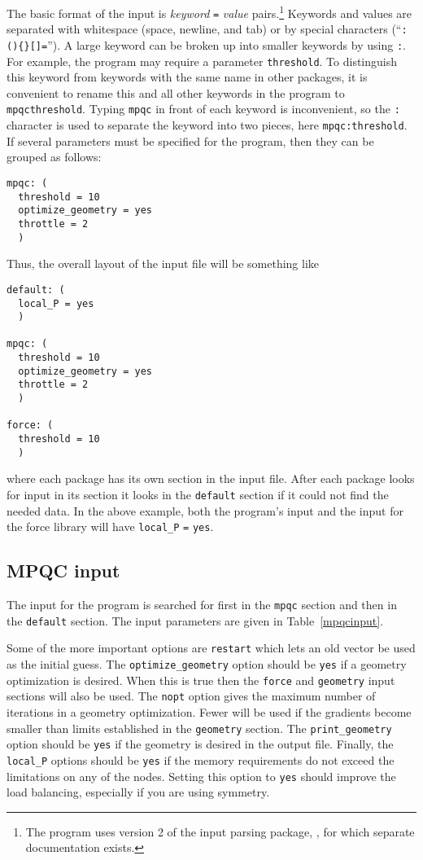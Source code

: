 The basic format of the input is {\it keyword} {\tt =} {\it value}
pairs.\footnote
  {
  The \mpqc{} program uses version 2 of the input parsing package, \libip{},
  for which separate documentation exists.
  }
Keywords and values are separated with whitespace (space, newline,
and tab) or by special characters (``{\tt :()\{\}[]=}'').  A large keyword
can be broken up into smaller keywords by using {\tt :}.  For example,
the \mpqc{} program may require a parameter {\tt threshold}.  To
distinguish this keyword from keywords with the same name in other
packages, it is convenient to rename this and all other keywords in
the \mpqc{} program to {\tt mpqcthreshold}.  Typing {\tt mpqc} in
front of each keyword is inconvenient, so the {\tt :} character
is used to separate the keyword into two pieces, here {\tt mpqc:threshold}.
If several parameters must be specified for the \mpqc{} program, then
they can be grouped as follows:
\begin{verbatim}
mpqc: (
  threshold = 10
  optimize_geometry = yes
  throttle = 2
  )
\end{verbatim}

Thus, the overall layout of the input file will be something like
\begin{verbatim}
default: (
  local_P = yes
  )

mpqc: (
  threshold = 10
  optimize_geometry = yes
  throttle = 2
  )

force: (
  threshold = 10
  )
\end{verbatim}
where each package has its own section in the input file.  After each
package looks for input in its section it looks in the {\tt default}
section if it could not find the needed data.  In the above example,
both the \mpqc{} program's input and the input for the force library
will have {\tt local\_P} {\tt =} {\tt yes}.

\subsection{MPQC input}
\label{mpqcsection}
The input for the \mpqc{} program is searched for first in the {\tt mpqc}
section and then in the {\tt default} section.  The input parameters are
given in Table~\ref{mpqcinput}.

Some of the more important options are {\tt restart} which lets
an old vector be used as the initial guess.  The {\tt optimize\_geometry}
option should be {\tt yes} if a geometry optimization is desired.
When this is true then the {\tt force} and {\tt geometry} input sections
will also be used.  The {\tt nopt} option gives the maximum number
of iterations in a geometry optimization.  Fewer will be used if the
gradients become smaller than limits established in the {\tt geometry}
section.  The {\tt print\_geometry} option should be {\tt yes} if
the geometry is desired in the output file.  Finally, the {\tt local\_P}
options should be {\tt yes} if the memory requirements do not exceed
the limitations on any of the nodes.  Setting this option to {\tt yes}
should improve the load balancing, especially if you are using symmetry.

